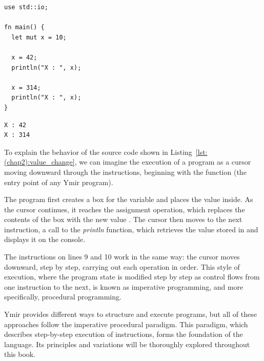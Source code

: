\begin{lstlisting}[style=coloredverbatim, caption=Example of mutable variable, label=lst:(chap2):value_change]
use std::io;

fn main() {
  let mut x = 10;

  x = 42;
  println("X : ", x);

  x = 314;
  println("X : ", x);
}
\end{lstlisting}
\vspace{-10pt}%
\begin{lstlisting}[style=bashVerb, label=lst:(chap2):value_change_output]
X : 42
X : 314
\end{lstlisting}

To explain the behavior of the source code shown in
Listing~\ref{lst:(chap2):value_change}, we can imagine the execution of a
program as a cursor moving downward through the instructions, beginning with the
 function (the entry point of any Ymir program).


The program first creates a box for the variable  and places
the value  inside. As the cursor continues, it reaches the assignment
operation, which replaces the contents of the box with the new value .
The cursor then moves to the next instruction, a call to the \textit{println}
function, which retrieves the value stored in  and displays it on the
console.

The instructions on lines 9 and 10 work in the same way: the cursor
moves downward, step by step, carrying out each operation in order. This style
of execution, where the program state is modified step by step as control flows
from one instruction to the next, is known as imperative programming, and more
specifically, procedural programming.


Ymir provides different ways to structure and execute programs, but
all of these approaches follow the imperative procedural paradigm. This
paradigm, which describes step-by-step execution of instructions, forms the
foundation of the language. Its principles and variations will be thoroughly
explored throughout this book.
